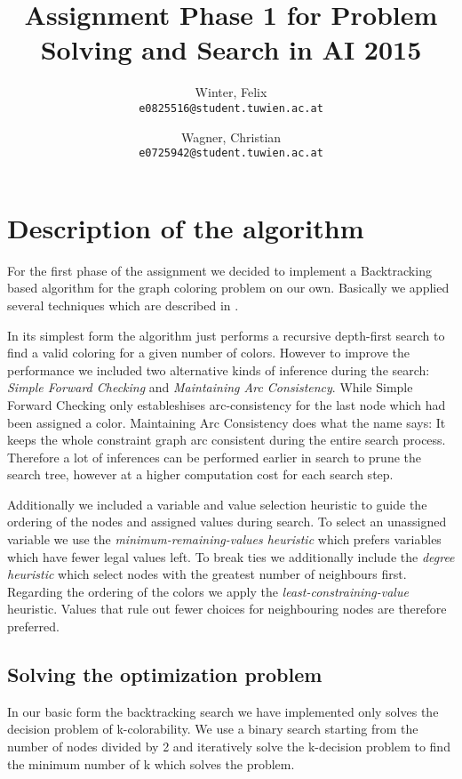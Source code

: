 \documentclass[a4paper]{scrartcl}
\author{
  Winter, Felix\\
  \texttt{e0825516@student.tuwien.ac.at}
  \and
  Wagner, Christian\\
  \texttt{e0725942@student.tuwien.ac.at}
}
\title{Assignment Phase 1 for Problem Solving and Search in AI 2015}
\begin{document}
\setlength{\abovedisplayskip}{0pt}
\setlength{\belowdisplayskip}{0pt}

\begingroup
 \makeatletter
 \maketitle
\endgroup

\section{Description of the algorithm}

For the first phase of the assignment we decided to implement a Backtracking based algorithm for the graph coloring problem on our own. Basically we applied several techniques which are described in \cite{Russell:2003:AIM:773294}.

In its simplest form the algorithm just performs a recursive depth-first search to find a valid coloring for a given number of colors. However to improve the performance we included two alternative kinds of inference during the search: \emph{Simple Forward Checking} and \emph{Maintaining Arc Consistency}. While Simple Forward Checking only estableshises arc-consistency for the last node which had been assigned a color. Maintaining Arc Consistency does what the name says: It keeps the whole constraint graph arc consistent during the entire search process. Therefore a lot of inferences can be performed earlier in search to prune the search tree, however at a higher computation cost for each search step.

Additionally we included a variable and value selection heuristic to guide the ordering of the nodes and assigned values during search.
To select an unassigned variable we use the \emph{minimum-remaining-values heuristic} which prefers variables which have fewer legal values left. To break ties we additionally include the \emph{degree heuristic} which select nodes with the greatest number of neighbours first.
Regarding the ordering of the colors we apply the \emph{least-constraining-value} heuristic. Values that rule out fewer choices for neighbouring nodes are therefore preferred.

\subsection{Solving the optimization problem}

In our basic form the backtracking search we have implemented only solves the decision problem of k-colorability. We use a binary search starting from the number of nodes divided by 2 and iteratively solve the k-decision problem to find the minimum number of k which solves the problem.
\end{document}
